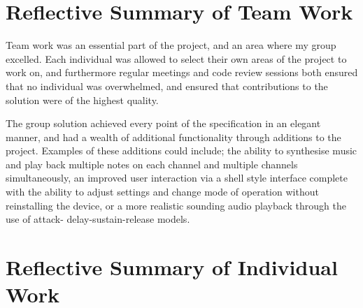 \section{Reflective Summary of Team Work}

Team work was an essential part of the project, and an area where my group 
excelled. Each individual was allowed to select their own areas of the project 
to work on, and furthermore regular meetings and code review sessions both ensured 
that no individual was overwhelmed, and ensured that contributions to the 
solution were of the highest quality. 
\par\bigskip\noindent
The group solution achieved every point of the specification in an elegant 
manner, and had a wealth of additional functionality through additions to the 
project. 
Examples of these additions could include; the ability to synthesise music and 
play back multiple notes on each channel and multiple channels simultaneously, 
an improved user interaction via a shell style interface complete with the 
ability to adjust settings and change mode of operation without reinstalling the 
device, or a more realistic sounding audio playback through the use of attack-
delay-sustain-release models. 

\section{Reflective Summary of Individual Work}

